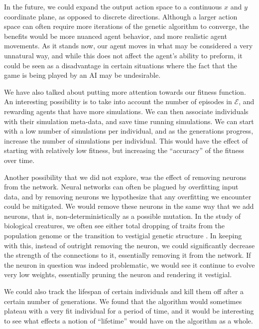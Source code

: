 \documentclass{article}
\begin{document}
In the future, we could expand the output action space to a continuous $x$ and
$y$ coordinate plane, as opposed to discrete directions. Although a larger
action space can often require more iterations of the genetic algorithm to
converge, the benefits would be more nuanced agent behavior, and more realistic
agent movements. As it stands now, our agent moves in what may be considered a
very unnatural way, and while this does not affect the agent's ability to
preform, it could be seen as a disadvantage in certain situations where the fact
that the game is being played by an AI may be undesirable.

We have also talked about putting more attention towards our fitness function. An interesting possibility is to take into account the number of episodes in $\bm{\mathcal{E}}$, and rewarding agents that have more simulations. We can then associate individuals with their simulation meta-data, and save time running simulations. We can start with a low number of simulations per individual, and as the generations progress, increase the number of simulations per individual. This would have the effect of starting with relatively low fitness, but increasing the ``accuracy'' of the fitness over time.

Another possibility that we did not explore, was the effect of removing neurons
from the network. Neural networks can often be plagued by overfitting input
data, and by removing neurons we hypothesize that any overfitting we encounter
could be mitigated. We would remove these neurons in the same way that we add
neurons, that is, non-deterministically as a possible mutation. In the study of
biological creatures, we often see either total dropping of traits from the
population genome or the transition to vestigial genetic structure
\cite{lehman}. In keeping with this, instead of outright removing the neuron, we
could significantly decrease the strength of the connections to it, essentially
removing it from the network. If the neuron in question was indeed problematic,
we would see it continue to evolve very low weights, essentially pruning the
neuron and rendering it vestigial.

We could also track the lifespan of certain individuals and kill them off after
a certain number of generations. We found that the algorithm would sometimes
plateau with a very fit individual for a period of time, and it would be
interesting to see what effects a notion of ``lifetime'' would have on the
algorithm as a whole.

\end{document}
